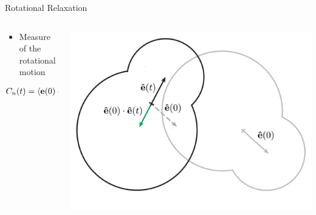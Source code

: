 \documentclass[16pt, aspectratio=43,compress]{beamer}
\begin{document}
\begin{frame}{Rotational Relaxation}
    \begin{columns}
        \begin{column}{0.5\linewidth}
            \begin{itemize}
                \item Measure of the rotational motion
            \end{itemize}
            \begin{align*}
                C_n(t) &= \langle \mathbf{e}(0) \cdot \mathbf{e}(t) \rangle
            \end{align*}
        \end{column}
        \begin{column}{0.5\linewidth}
            \includegraphics[width=\textwidth]{rot}
        \end{column}
    \end{columns}
\end{frame}
\end{document}
